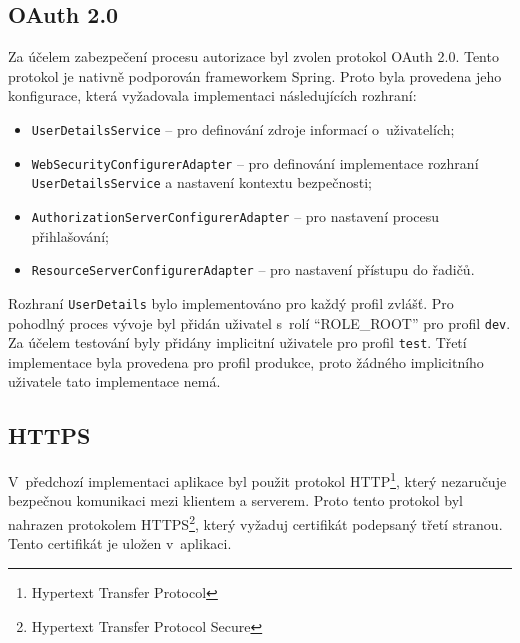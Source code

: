     \subsection{OAuth 2.0}
        Za účelem zabezpečení procesu autorizace byl zvolen protokol OAuth 2.0. Tento protokol je nativně podporován frameworkem Spring. Proto byla provedena jeho konfigurace, která vyžadovala implementaci následujících rozhraní:
        \begin{itemize}
            \item \texttt{UserDetailsService} -- pro definování zdroje informací o~uživatelích;
            \item \texttt{WebSecurityConfigurerAdapter} -- pro definování implementace rozhraní \texttt{UserDetailsService} a nastavení kontextu bezpečnosti;
            \item \texttt{AuthorizationServerConfigurerAdapter} -- pro nastavení procesu přihlašování;
            \item \texttt{ResourceServerConfigurerAdapter} -- pro nastavení přístupu do řadičů.
        \end{itemize}
        
        Rozhraní \verb|UserDetails| bylo implementováno pro každý profil zvlášť. Pro pohodlný proces vývoje byl přidán uživatel s~rolí \enquote{ROLE\_ROOT} pro profil \verb|dev|. Za účelem testování byly přidány implicitní uživatele pro profil \verb|test|. Třetí implementace byla provedena pro profil produkce, proto žádného implicitního uživatele tato implementace nemá.
        
    \subsection{HTTPS}
        V~předchozí implementaci aplikace byl použit protokol HTTP\footnote{Hypertext Transfer Protocol}, který nezaručuje bezpečnou komunikaci mezi klientem a serverem. Proto tento protokol byl nahrazen protokolem HTTPS\footnote{Hypertext Transfer Protocol Secure}, který vyžaduj certifikát podepsaný třetí stranou. Tento certifikát je uložen v~aplikaci.
        
